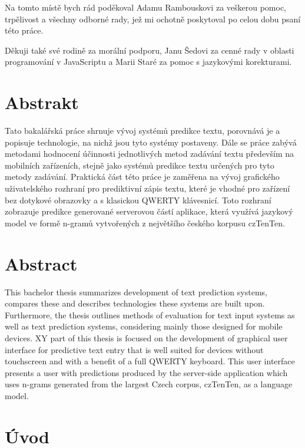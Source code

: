 \documentclass[a4paper,11pt,openany]{book} %
\begin{document}
Na tomto místě bych rád poděkoval Adamu Rambouskovi za veškerou pomoc, trpělivost a všechny odborné rady, jež mi ochotně poskytoval po celou dobu psaní této práce. 

Děkuji také své rodině za morální podporu, Janu Šedovi za cenné rady v oblasti programování v JavaScriptu a Marii Staré za pomoc s jazykovými korekturami.

\clearpage

\section*{Abstrakt}

Tato bakalářská práce shrnuje vývoj systémů predikce textu, porovnává je a popisuje technologie, na nichž jsou tyto systémy postaveny. Dále se práce zabývá metodami hodnocení účinnosti jednotlivých metod zadávání textu především na mobilních zařízeních, stejně jako systémů predikce textu určených pro tyto metody zadávání. Praktická část této práce je zaměřena na vývoj grafického uživatelského rozhraní pro prediktivní zápis textu, které je vhodné pro zařízení bez dotykové obrazovky a s klasickou QWERTY klávesnicí. Toto rozhraní zobrazuje predikce generované serverovou částí aplikace, která využívá jazykový model ve formě n-gramů vytvořených z největšího českého korpusu czTenTen.

\section*{Abstract}

This bachelor thesis summarizes development of text prediction systems, compares these and describes technologies these systems are built upon. Furthermore, the thesis outlines methods of evaluation for text input systems as well as text prediction systems, considering mainly those designed for mobile devices. XY part of this thesis is focused on the development of graphical user interface for predictive text entry that is well suited for devices without touchscreen and with a benefit of a full QWERTY keyboard. This user interface presents a user with predictions produced by the server-side application which uses n-grams generated from the largest Czech corpus, czTenTen, as a language model.

\clearpage

\tableofcontents

\clearpage


\section*{Úvod}
\end{document}
